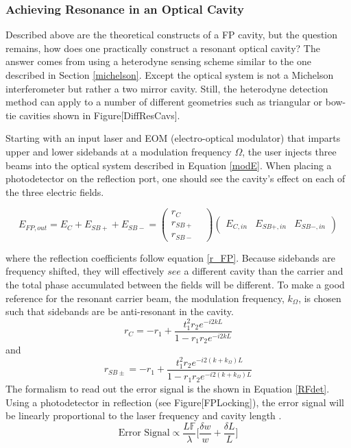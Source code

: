 		\subsubsection{Achieving Resonance in an Optical Cavity}
		Described above are the theoretical constructs of a FP cavity, but the question remains, how does one practically construct a resonant optical cavity?  The answer comes from using a heterodyne sensing scheme similar to the one described in Section \ref{michelson}.  Except the optical system is not a Michelson interferometer but rather a two mirror cavity.  Still, the heterodyne detection method can apply to a number of different geometries such as triangular or bow-tie cavities shown in Figure[DiffResCavs].
		
		Starting with an input laser and EOM (electro-optical modulator) that imparts upper and lower sidebands at a modulation frequency $\Omega$, the user injects three beams into the optical system described in Equation \ref{modE}.  When placing a photodetector on the reflection port, one should see the cavity's effect on each of the three electric fields.
		
		\begin{equation}
		E_{FP,out} = E_{C} + E_{SB+} + E_{SB-} = 
		\begin{pmatrix}
		r_{C} 	&   
		\\ 	r_{SB+} &
		\\ 	r_{SB-} &
		\end{pmatrix}
		\begin{pmatrix}
		E_{C,in} &    E_{SB+,in}    &  E_{SB-,in}     
		\end{pmatrix}
		\end{equation}
		
		where the reflection coefficients follow equation \ref{r_FP}.  Because sidebands are frequency shifted, they will effectively $see$ a different cavity than the carrier and the total phase accumulated between the fields will be different. To make a good reference for the resonant carrier beam, the modulation frequency, $k_{\Omega}$, is chosen such that sidebands are be anti-resonant in the cavity.  
		\begin{equation}
		r_{C} = -r_1 + \frac{t_1^2 r_2  e^{-i2kL}}{1-r_1 r_2 e^{-i2kL}}
		\end{equation}
		and 
		\begin{equation}
		r_{SB\pm} = -r_1 + \frac{t_1^2 r_2  e^{-i2(k+k_{\Omega})L}}{1-r_1 r_2 e^{-i2(k+k_{\Omega})L}}
		\end{equation}
		The formalism to read out the error signal is the shown in Equation \ref{RFdet}. Using a photodetector in reflection (see Figure[FPLocking]), the error signal will be linearly proportional to the laser frequency and cavity length \cite{BlackPDH}.
		\begin{equation}
		\text{Error Signal} \propto \frac{L \mathbb{F}}{\lambda} \bigg[\frac{\delta w}{w} + \frac{\delta L}{L}\bigg]
		\end{equation}
		
